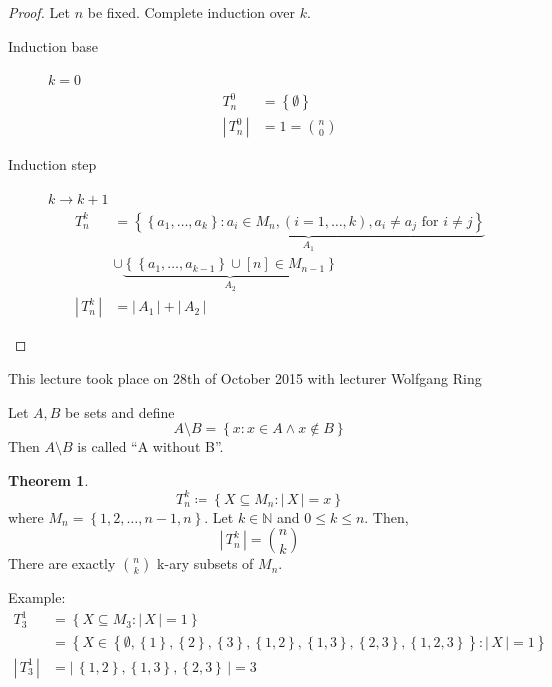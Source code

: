 \documentclass[a4paper,landscape,twocolumn]{article}
\theoremstyle{definition}
\newtheorem{theorem}{Theorem}
\newcommand\set[1]{\left\{#1\right\}}
\newcommand\card[1]{\left|\,#1\,\right|}
\newcommand\meta[3]{\begin{mdframed}[skipbelow=4pt,skipabove=4pt,innermargin=1pt,innerleftmargin=1pt,innerrightmargin=1pt]\begin{center}\small{\textdownarrow{} This #1 took place on #2 with lecturer #3}\end{center}\end{mdframed}}
\begin{document}
\begin{proof}
  Let $n$ be fixed. Complete induction over $k$.
  \begin{description}
    \item[Induction base] $k=0$
      \begin{align*}
        T_n^0        &= \set{\emptyset} \\
        \card{T_n^0} &= 1 = \binom n0
      \end{align*}
    \item[Induction step] $k\to k+1$
      \begin{align*}
        T_n^k &= \underbrace{\set{\set{a_1, \ldots, a_k}: a_i \in M_n, (i = 1, \ldots, k), a_i \neq a_j \text{ for } i \neq j}}_{A_1} \\
              &\cup \underbrace{\set{\set{a_1, \ldots, a_{k-1}} \cup [n] \in M_{n-1}}}_{A_2} \\
        \card{T_n^k} &= \card{A_1} + \card{A_2}
      \end{align*}
  \end{description}
\end{proof}

\meta{lecture}{28th of October 2015}{Wolfgang Ring}

Let $A, B$ be sets and define
\[ A \setminus B = \set{x: x \in A \land x \not\in B} \]
Then $A \setminus B$ is called \enquote{A without B}.

\begin{theorem}
  \[ T_n^k \coloneqq \set{X \subseteq M_n: \card{X} = x} \]
  where $M_n = \set{1, 2, \ldots, n-1, n}$.
  Let $k \in \mathbb{N}$ and $0 \leq k \leq n$. Then,
  \[ \card{T_n^k} = \binom{n}{k} \]
  There are exactly $\binom{n}{k}$ k-ary subsets of $M_n$.
\end{theorem}

Example:
\begin{align*}
  T_3^1 &= \set{X \subseteq M_3: \card{X} = 1} \\
    &= \set{X \in \set{\emptyset, \set{1}, \set{2}, \set{3}, \set{1,2}, \set{1,3}, \set{2,3}, \set{1,2,3}}: \card{X} = 1} \\
  \card{T_3^1} &= \card{\set{1,2}, \set{1,3}, \set{2,3}} = 3
\end{align*}
\end{document}
